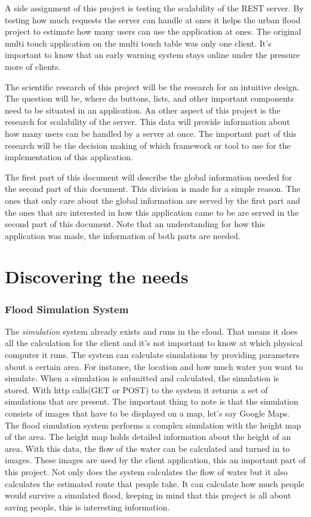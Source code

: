 A side assignment of this project is testing the scalability of the REST server. By testing how much requests the server can handle at ones it helps the urban flood project to estimate how many users can use the application at ones. The original multi touch application on the multi touch table was only one client. It's important to know that an early warning system stays online under the pressure more of clients.

The scientific research of this project will be the research for an intuitive design. The question will be, where do buttons, lists, and other important components need to be situated in an application. An other aspect of this project is the research for scalability of the server. This data will provide information about how many users can be handled by a server at once. The important part of this research will be the decision making of which framework or tool to use for the implementation of this application.

The first part of this document will describe the global information needed for the second part of this document. This division is made for  a simple reason. The ones that only care about the global information are served by the first part and the ones that are interested in how this application came to be are served in the second part of this document. Note that an understanding for how this application was made, the information of both parts are needed.

\part{Discovering the needs}
\section{Flood Simulation System}
The \emph{simulation} system already exists and runs in the cloud. That means it does all the calculation for the client and it's not important to know at which physical computer it runs. The system can calculate simulations by providing parameters about a certain area. For instance, the location and how much water you want to simulate. When a simulation is submitted and calculated, the simulation is stored. With http calls(GET or POST) to the system it returns a set of simulations that are present. The important thing to note is that the simulation consists of images that have to be displayed on a map, let's say Google Maps. The flood simulation system performs a complex simulation with the height map of the area. The height map holds detailed information about the height of an area. With this data, the flow of the water can be calculated and turned in to images. These images are used by the client application, this an important part of this project.
Not only does the system calculates the flow of water but it also calculates the estimated route that people take. It can calculate how much people would survive a simulated flood, keeping in mind that this project is all about saving people, this is interesting information.
 
